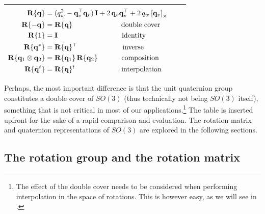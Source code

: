 \begin{table}[htp]
\begin{center}
\begin{tabular}{|c|c|c|}
{$\begin{aligned}
\rule{0pt}{2.7ex} %
\bfR\{\bfq\} &= (q_w^2-\qv\tr\qv)\,\bfI + 2\,\qv\qv\tr + 2\,q_w\hatx{\qv} \\
\bfR\{-\bfq\}&=\bfR\{\bfq\} ~~~~~~~~~~~~~~~~~~~~\, \text{double cover} \\
\bfR\{1\}&=\bfI ~~~~~~~~~~~~~~~~~~~~~~~~~~~ \text{identity}\\
\bfR\{\bfq^*\}&=\bfR\{\bfq\}\tr ~~~~~~~~~~~~~~~~~~~ \text{inverse}\\
\bfR\{\bfq_1\ot\bfq_2\}&=\bfR\{\bfq_1\}\,\bfR\{\bfq_2\} ~~~~~~~~~~ \text{composition}\\
\bfR\{\bfq^t\} &= \bfR\{\bfq\}^t ~~~~~~~~~~~~~~~~~~~\, \text{interpolation} 
\end{aligned}$} \\
\hline
\end{tabular}
\end{center}
\end{table}%
%
Perhaps, the most important difference is that the unit quaternion group constitutes a double cover of $SO(3)$ (thus technically not being $SO(3)$ itself), something that is not critical in most of our applications.\footnote{The effect of the double cover needs to be considered when performing interpolation in the space of rotations. This is however easy, as we will see in .}
The table is inserted upfront for the sake of a rapid comparison and evaluation.
The rotation matrix and quaternion representations of $SO(3)$ are explored in the following sections.



\subsection{The rotation group and the rotation matrix}


